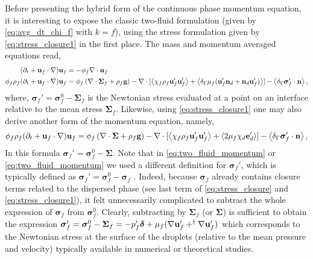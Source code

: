 Before presenting the hybrid form of the continuous phase momentum equation, it is interesting to expose the classic two-fluid formulation (given by \ref{eq:avg_dt_chi_f} with $k=f$), using the stress formulation given by \ref{eq:stress_closure1} in the first place. 
The mass and momentum averaged equations read, 
\begin{align}
    (\pddt + \textbf{u}_f\cdot \grad)\textbf{u}_f&=-\phi_f \div \textbf{u}_f\\
    \phi_f \rho_f(\pddt + \textbf{u}_f  \cdot \grad) \textbf{u}_f
    &= \phi_f 
    \left(\div \bm{\Sigma}_f
    + \rho_f \textbf{g}\right)
    - \div 
    [\avg{\chi_f\rho_f \textbf{u}_f'\textbf{u}_f'}
    +\avg{\delta_\Gamma \mu_f( \textbf{u}_f'  \textbf{n}_d +  \textbf{n}_d \textbf{u}_f')}]
    - \avg{\delta_\Gamma \bm\sigma_f'\cdot \textbf{n}},
    \label{eq:two_fluid_momentum}
\end{align}
where, $\bm\sigma_f'=\bm\sigma_f^0 - \bm\Sigma_f$ is the Newtonian stress evaluated at a point on an interface relative to the mean stress $\bm\Sigma_f$. 
Likewise, using \ref{eq:stress_closure1} one may also derive another form of the momentum equation, namely,
\begin{equation}
    \phi_f \rho_f(\pddt + \textbf{u}_f  \cdot \grad) \textbf{u}_f
    = \phi_f 
    \left(\div \bm{\Sigma}
    + \rho_f \textbf{g}\right)
    - \div 
    [\avg{\chi_f\rho_f \textbf{u}_f'\textbf{u}_f'} + \avg{2\mu_f \chi_d \textbf{e}_d'}]
    - \avg{\delta_\Gamma \bm\sigma_f'\cdot \textbf{n}},
    \label{eq:two_fluid_momentum2}
\end{equation} 
In this formula $\bm\sigma_f'=\bm\sigma_f^0 - \bm\Sigma$.
Note that in \ref{eq:two_fluid_momentum} or \ref{eq:two_fluid_momentum} we used a different definition for $\bm\sigma_f'$, which is typically defined as $\bm\sigma_f'= \bm\sigma_f^0 - \bm\sigma_f$ \citep{zhang1997momentum}. 
Indeed, because $\bm\sigma_f$ already contains closure terms related to the dispersed phase (see last term of \ref{eq:stress_closure} and \ref{eq:stress_closure1}), it felt unnecessarily complicated to subtract the whole expression of $\bm\sigma_f$ from $\bm\sigma_f^0$.
Clearly, subtracting by $\bm\Sigma_f$ (or $\bm\Sigma$) is sufficient to obtain the expression $\bm\sigma_f' = \bm\sigma_f^0 - \bm\Sigma_f = -p_f' \bm\delta + \mu_f (\mathbf{\nabla} \textbf{u}_f' + ^\dagger \mathbf{\nabla} \textbf{u}_f')$ which corresponds to the Newtonian stress at the surface of the droplets (relative to the mean pressure and velocity) typically available in numerical or theoretical studies.
